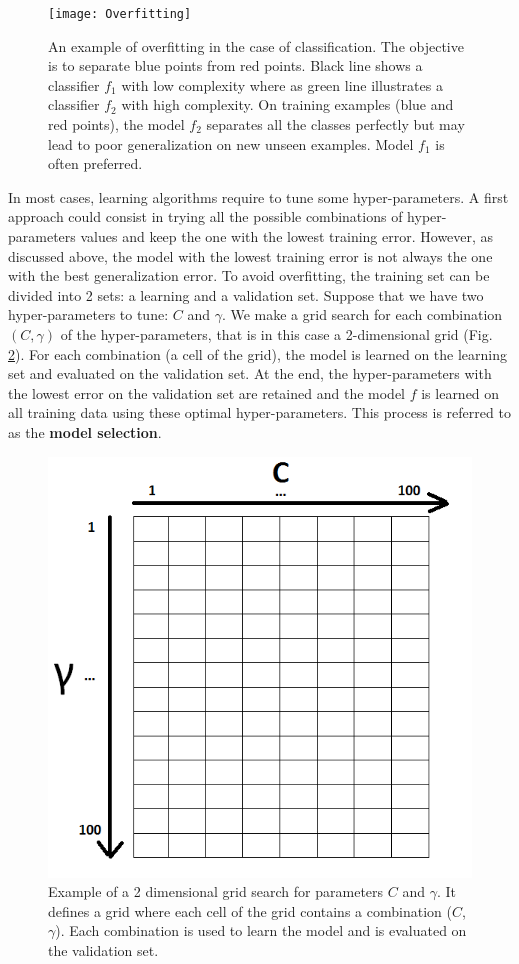 \begin{figure}[h!]
	\centering
	\texttt{[image: Overfitting]}
	\caption[An example of overfitting in the case of classification.]{An example of overfitting in the case of classification. The objective is to separate blue points from red points. Black line shows a classifier $f_1$ with low complexity where as green line illustrates a classifier $f_2$ with high complexity. On training examples (blue and red points), the model $f_2$ separates all the classes perfectly but may lead to poor generalization on new unseen examples. Model $f_1$ is often preferred.}
	\label{fig:Overfitting}
\end{figure}

In most cases, learning algorithms require to tune some hyper-parameters. A first approach could consist in trying all the possible combinations of hyper-parameters values and keep the one with the lowest training error. However, as discussed above, the model with the lowest training error is not always the one with the best generalization error. To avoid overfitting, the training set can be divided into 2 sets: a learning and a validation set. Suppose that we have two hyper-parameters to tune: $C$ and $\gamma$. We make a grid search for each combination $(C,\gamma)$ of the hyper-parameters, that is in this case a 2-dimensional grid (Fig. \ref{fig:GridSearch}). For each combination (a cell of the grid), the model is learned on the learning set and evaluated on the validation set. At the end, the hyper-parameters with the lowest error on the validation set are retained and the model $f$ is learned on all training data using these optimal hyper-parameters. This process is referred to as the \textbf{model selection}. 

\begin{figure}[h!]
	\centering
	\includegraphics[width=0.4\linewidth]{images/GridSearch}
	\caption[Example of a 2 dimensional grid search for parameters $C$ and $\gamma$]{Example of a 2 dimensional grid search for parameters $C$ and $\gamma$. It defines a grid where each cell of the grid contains a combination ($C$, $\gamma$). Each combination is used to learn the model and is evaluated on the validation set.}
	\label{fig:GridSearch}
\end{figure}

